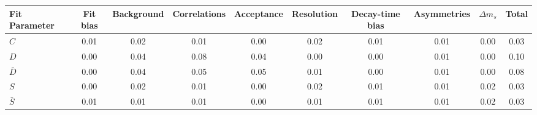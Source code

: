 \begin{tabular}{l  c  c  c  c  c  c  c  c  | c }
\hline
\hline
Fit Parameter & Fit bias & Background & Correlations & Acceptance & Resolution & Decay-time bias & Asymmetries & $\Delta m_{s}$ &  Total  \\ 
\hline
$C$ & 0.01 & 0.02 & 0.01 & 0.00 & 0.02 & 0.01 & 0.01 & 0.00 & 0.03 \\ 
$D$ & 0.00 & 0.04 & 0.08 & 0.04 & 0.00 & 0.00 & 0.01 & 0.00 & 0.10 \\ 
$\bar{D}$ & 0.00 & 0.04 & 0.05 & 0.05 & 0.01 & 0.00 & 0.01 & 0.00 & 0.08 \\ 
$S$ & 0.00 & 0.02 & 0.01 & 0.00 & 0.02 & 0.01 & 0.01 & 0.02 & 0.03 \\ 
$\bar{S}$ & 0.01 & 0.01 & 0.01 & 0.00 & 0.01 & 0.01 & 0.01 & 0.02 & 0.03 \\ 
\hline
\hline
\end{tabular}
